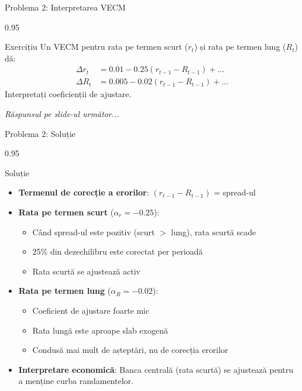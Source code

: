 \documentclass[9pt, aspectratio=169, t]{beamer}
\begin{document}
\begin{frame}{Problema 2: Interpretarea VECM}
    \begin{cminipage}{0.95\textwidth}
    \begin{block}{Exercițiu}
        Un VECM pentru rata pe termen scurt ($r_t$) și rata pe termen lung ($R_t$) dă:
        \begin{align*}
            \Delta r_t &= 0.01 - 0.25(r_{t-1} - R_{t-1}) + \ldots \\
            \Delta R_t &= 0.005 - 0.02(r_{t-1} - R_{t-1}) + \ldots
        \end{align*}
        Interpretați coeficienții de ajustare.
    \end{block}

    \vspace{0.5cm}
    \begin{flushright}\textit{Răspunsul pe slide-ul următor...}\end{flushright}
    \end{cminipage}
\end{frame}

\begin{frame}{Problema 2: Soluție}
    \begin{cminipage}{0.95\textwidth}
    \begin{exampleblock}{Soluție}
        \begin{itemize}\setlength{\itemsep}{0pt}
            \item \textbf{Termenul de corecție a erorilor}: $(r_{t-1} - R_{t-1})$ = spread-ul
            \item \textbf{Rata pe termen scurt} ($\alpha_r = -0.25$):
            \begin{itemize}\setlength{\itemsep}{0pt}
                \item Când spread-ul este pozitiv (scurt $>$ lung), rata scurtă scade
                \item 25\% din dezechilibru este corectat per perioadă
                \item Rata scurtă se ajustează activ
            \end{itemize}
            \item \textbf{Rata pe termen lung} ($\alpha_R = -0.02$):
            \begin{itemize}\setlength{\itemsep}{0pt}
                \item Coeficient de ajustare foarte mic
                \item Rata lungă este aproape slab exogenă
                \item Condusă mai mult de așteptări, nu de corecția erorilor
            \end{itemize}
            \item \textbf{Interpretare economică}: Banca centrală (rata scurtă) se ajustează pentru a menține curba randamentelor.
        \end{itemize}
    \end{exampleblock}
    \end{cminipage}
\end{frame}
\end{document}
